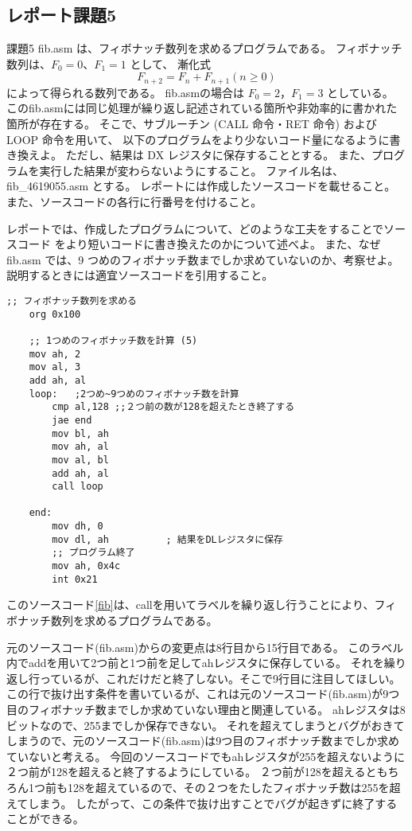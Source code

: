 \documentclass[12pt]{jarticle}
\begin{document}
\subsection{レポート課題5}
\begin{itembox}[l]{課題5}
	fib.asm は、フィボナッチ数列を求めるプログラムである。
	フィボナッチ数列は、$F_0 = 0$、$F_1 = 1$ として、
	漸化式
	$$F_{n+2} = F_n + F_{n+1}  (n \geq 0)$$
	によって得られる数列である。
	fib.asmの場合は $F_0 = 2$，$F_1 = 3$ としている。
	このfib.asmには同じ処理が繰り返し記述されている箇所や非効率的に書かれた箇所が存在する。
	そこで、サブルーチン (CALL 命令・RET 命令) および LOOP 命令を用いて、
	以下のプログラムをより少ないコード量になるように書き換えよ。
	ただし、結果は DX レジスタに保存することとする。
	また、プログラムを実行した結果が変わらないようにすること。
	ファイル名は、fib\_4619055.asm とする。
	レポートには作成したソースコードを載せること。
	また、ソースコードの各行に行番号を付けること。

	レポートでは、作成したプログラムについて、どのような工夫をすることでソースコード
	をより短いコードに書き換えたのかについて述べよ。
	また、なぜ fib.asm では、9 つめのフィボナッチ数までしか求めていないのか、考察せよ。
	説明するときには適宜ソースコードを引用すること。
\end{itembox}
\begin{lstlisting}[caption=fib\_4619055.asm,label=fib]
	;; フィボナッチ数列を求める
	org 0x100
	 
	;; 1つめのフィボナッチ数を計算 (5)
	mov ah, 2
	mov al, 3
	add ah, al
	loop:   ;2つめ~9つめのフィボナッチ数を計算
		cmp al,128 ;;２つ前の数が128を超えたとき終了する
		jae end
		mov bl, ah
		mov ah, al
		mov al, bl
		add ah, al
		call loop
	 
	end:
		mov dh, 0
		mov dl, ah          ; 結果をDLレジスタに保存
		;; プログラム終了
		mov ah, 0x4c
		int 0x21
\end{lstlisting}

このソースコード\ref{fib}は、callを用いてラベルを繰り返し行うことにより、フィボナッチ数列を求めるプログラムである。

元のソースコード(fib.asm)からの変更点は8行目から15行目である。
このラベル内でaddを用いて2つ前と1つ前を足してahレジスタに保存している。
それを繰り返し行っているが、これだけだと終了しない。そこで9行目に注目してほしい。
この行で抜け出す条件を書いているが、これは元のソースコード(fib.asm)が9つ目のフィボナッチ数までしか求めていない理由と関連している。
ahレジスタは8ビットなので、255までしか保存できない。
それを超えてしまうとバグがおきてしまうので、元のソースコード(fib.asm)は9つ目のフィボナッチ数までしか求めていないと考える。
今回のソースコードでもahレジスタが255を超えないように２つ前が128を超えると終了するようにしている。
２つ前が128を超えるともちろん1つ前も128を超えているので、その２つをたしたフィボナッチ数は255を超えてしまう。
したがって、この条件で抜け出すことでバグが起きずに終了することができる。
\end{document}
